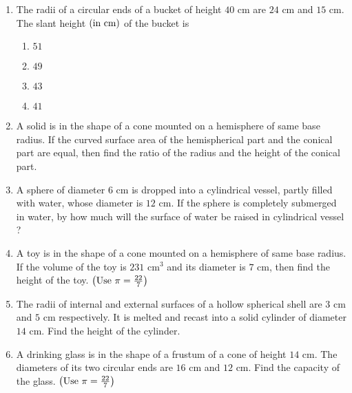 \begin{enumerate}
\item The radii of a circular ends of a bucket of height $40\text{ cm}$ are $24\text{ cm}$ and $15\text{ cm}$. The slant height $\left(\text{in cm}\right)$ of the bucket is\\
\begin{enumerate}
\item $51$\\
\item $49$\\
\item $43$\\
\item $41$\\
\end{enumerate}

\item A solid is in the shape of a cone mounted on a hemisphere of same base radius. If the curved surface area of the hemispherical part and the conical part are equal, then find the ratio of the radius and the height of the conical part.\\

\item A sphere of diameter $6\text{ cm}$ is dropped into a cylindrical vessel, partly filled with water, whose diameter is $12\text{ cm}$. If the sphere is completely submerged in water, by how much will the surface of water be raised in cylindrical vessel ?\\
\item A toy is in the shape of a cone mounted on a hemisphere of same base radius. If the volume of the toy is $231\text{ cm}^3$ and its diameter is $7\text{ cm}$, then find the height of the toy.  $\left(\text{Use } \pi = \frac{22}{7}\right)$\\

\item The radii of internal and external surfaces of a hollow spherical shell are $3\text{ cm}$ and $5\text{ cm}$ respectively. It is melted and recast into a solid cylinder of diameter $14\text{ cm}$. Find the height of the cylinder.\\

\item A drinking glass is in the shape of a frustum of a cone of height $14\text{ cm}$. The diameters of its two circular ends are $16\text{ cm}$ and $12\text{ cm}$. Find the capacity of the glass. $\left(\text{Use } \pi = \frac{22}{7}\right)$\\

\end{enumerate}

